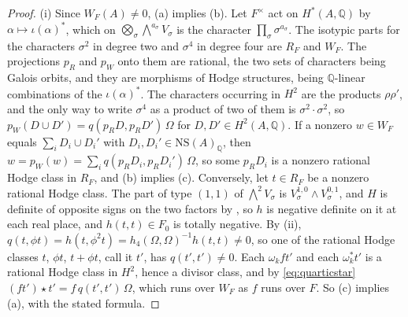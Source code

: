 \documentclass[11pt,reqno]{amsart}
\theoremstyle{plain}
\theoremstyle{definition}
\theoremstyle{remark}
\newcommand{\QQ}{\mathbb{Q}}
\newcommand{\NS}{\mathrm{NS}}
\begin{document}
\begin{proof}
(i) Since $W_{F}(A)\ne0$, (a) implies (b). Let $F^{\times}$ act on $H^{*}(A,\QQ)$ by
$\alpha\mapsto\iota(\alpha)^{*}$, which on
$\bigotimes_{\sigma}\bigwedge^{a_{\sigma}}V_{\sigma}$ is the character
$\prod_{\sigma}\sigma^{a_{\sigma}}$. The isotypic parts for the characters
$\sigma^{2}$ in degree two and $\sigma^{4}$ in degree four are $R_{F}$ and
$W_{F}$. The projections $p_{R}$ and $p_{W}$ onto them are rational, the two
sets of characters being Galois orbits, and they are morphisms of Hodge
structures, being $\QQ$-linear combinations of the $\iota(\alpha)^{*}$. The
characters occurring in $H^{2}$ are the products $\rho\rho'$, and the only way
to write $\sigma^{4}$ as a product of two of them is $\sigma^{2}\cdot\sigma^{2}$,
so $p_{W}(D\cup D')=q(p_{R}D,p_{R}D')\,\Omega$ for $D,D'\in H^{2}(A,\QQ)$. If a
nonzero $w\in W_{F}$ equals $\sum_{i}D_{i}\cup D_{i}'$ with
$D_{i},D_{i}'\in\NS(A)_{\QQ}$, then
$w=p_{W}(w)=\sum_{i}q(p_{R}D_{i},p_{R}D_{i}')\,\Omega$, so some $p_{R}D_{i}$ is
a nonzero rational Hodge class in $R_{F}$, and (b) implies (c). Conversely,
let $t\in R_{F}$ be a nonzero rational Hodge class. The part of type $(1,1)$
of $\bigwedge^{2}V_{\sigma}$ is $V_{\sigma}^{1,0}\wedge V_{\sigma}^{0,1}$, and
$H$ is definite of opposite signs on the two factors by \cite[Proposition~17.3(i)]{paperI},
so $h$ is negative definite on it at each real place, and $h(t,t)\in F_{0}$ is
totally negative. By (ii),
$q(t,\phi t)=h(t,\phi^{2}t)=h_{4}(\Omega,\Omega)^{-1}h(t,t)\ne0$, so one of the
rational Hodge classes $t$, $\phi t$, $t+\phi t$, call it $t'$, has
$q(t',t')\ne0$. Each $\omega_{k}ft'$ and each $\omega_{k}^{*}t'$ is a rational
Hodge class in $H^{2}$, hence a divisor class, and by \eqref{eq:quarticstar}
$(ft')\star t'=f\,q(t',t')\,\Omega$, which runs over $W_{F}$ as $f$ runs over
$F$. So (c) implies (a), with the stated formula.


\end{proof}
\end{document}
